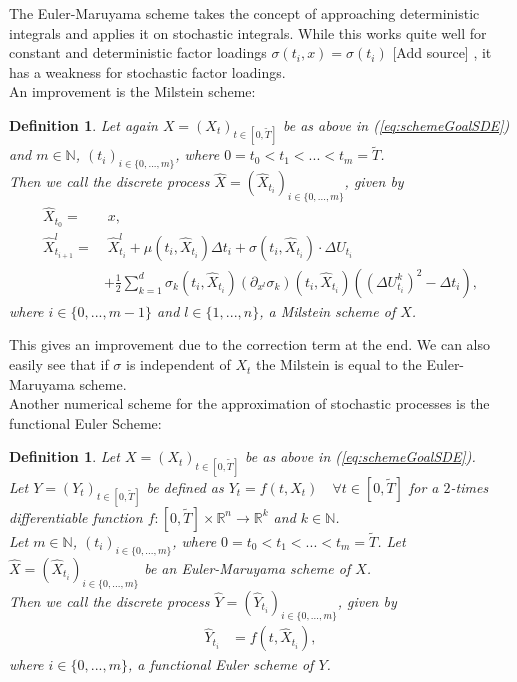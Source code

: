 \documentclass[12pt]{article}
\newtheorem{definition}[theorem]{Definition}
\begin{document}
	The Euler-Maruyama scheme takes the concept of approaching deterministic integrals and applies it on stochastic integrals. While this works quite well for constant and deterministic factor loadings $\sigma(t_i, x) = \sigma(t_i)$ \color{red}[Add source]\color{black} %
	, it has a weakness for stochastic factor loadings.\\
	An improvement is the Milstein scheme:
	\begin{definition}
		Let again $X=(X_t)_{t\in [0,\tilde{T}]}$ be as above in (\ref{eq:schemeGoalSDE}) and $m \in \mathbb{N}$, $(t_i)_{i\in \{0, ..., m\}}$, where $0=t_0 < t_1 < ... < t_m=\tilde{T}$.\\
		Then we call the discrete process $\hat{X} = (\hat{X}_{t_i})_{i \in \{0, ..., m\}}$, given by
		\begin{align*}
			\hat{X}_{t_0} =&\; x,\\
			\hat{X}^l_{t_{i+1}} =&\; \hat{X}^l_{t_{i}} + \mu(t_i, \hat{X}_{t_{i}})\Delta t_i + \sigma(t_i, \hat{X}_{t_{i}}) \cdot \Delta U_{t_i}\\
			&+ \frac{1}{2}\sum_{k=1}^{d}\sigma_k(t_i, \hat{X}_{t_i})(\partial_{x^l}\sigma_k)(t_i, \hat{X}_{t_i})((\Delta U^k_{t_i})^2 - \Delta t_i),
		\end{align*}
		where $i \in \{0, ..., m-1\}$ and $l \in \{1, ..., n\}$, a \emph{Milstein scheme of $X$}.
	\end{definition}
	This gives an improvement due to the correction term at the end. We can also easily see that if $\sigma$ is independent of $X_t$ the Milstein is equal to the Euler-Maruyama scheme.\\
	Another numerical scheme for the approximation of stochastic processes is the functional Euler Scheme:
	\begin{definition}
		Let $X=(X_t)_{t\in [0,\tilde{T}]}$ be as above in (\ref{eq:schemeGoalSDE}).\\
		Let $Y=(Y_t)_{t\in [0,\tilde{T}]}$ be defined as $Y_t = f(t, X_t) \quad \forall t\in [0,\tilde{T}]$ for a $2$-times differentiable function $f: [0,\tilde{T}] \times \mathbb{R}^n \rightarrow \mathbb{R}^k$ and $k \in \mathbb{N}$.\\
		Let $m \in \mathbb{N}$, $(t_i)_{i\in \{0, ..., m\}}$, where $0=t_0 < t_1 < ... < t_m=\tilde{T}$. Let  $\hat{X} = (\hat{X}_{t_i})_{i \in \{0, ..., m\}}$ be an Euler-Maruyama scheme of $X$.\\
		Then we call the discrete process $\hat{Y} = (\hat{Y}_{t_i})_{i \in \{0, ..., m\}}$, given by
		\begin{align*}
			\hat{Y}_{t_i} &= f(t,\hat{X}_{t_i}),
		\end{align*}
		where $i \in \{0, ..., m\}$, a \emph{functional Euler scheme of $Y$}.
	\end{definition}
\end{document}
